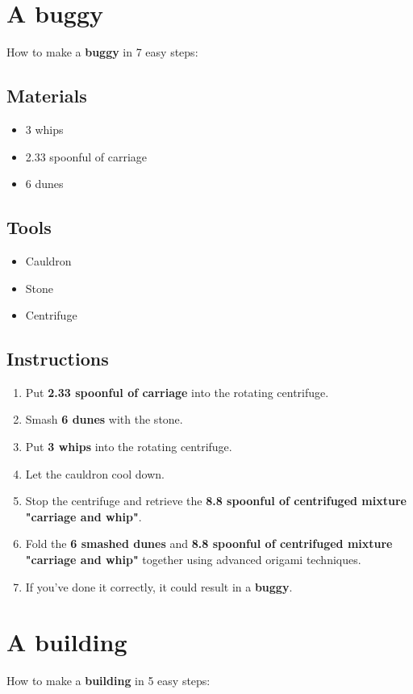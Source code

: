 \documentclass{article}
\begin{document}
\section{A buggy}How to make a \textbf{buggy} in 7 easy steps:

\subsection{Materials}\begin{itemize}
\item 
3 whips
\item 
2.33 spoonful of carriage
\item 
6 dunes
\end{itemize}
\subsection{Tools}\begin{itemize}
\item 
Cauldron
\item 
Stone
\item 
Centrifuge
\end{itemize}
\subsection{Instructions}\begin{enumerate}
\item 
Put \textbf{2.33 spoonful of carriage} into the rotating centrifuge.
\item 
Smash \textbf{6 dunes} with the stone.
\item 
Put \textbf{3 whips} into the rotating centrifuge.
\item 
Let the cauldron cool down.
\item 
Stop the centrifuge and retrieve the \textbf{8.8 spoonful of centrifuged mixture "carriage and whip"}.
\item 
Fold the \textbf{6 smashed dunes} and \textbf{8.8 spoonful of centrifuged mixture "carriage and whip"} together using advanced origami techniques.
\item 
If you've done it correctly, it could result in a \textbf{buggy}.
\end{enumerate}
\newpage
\section{A building}How to make a \textbf{building} in 5 easy steps:
\end{document}
